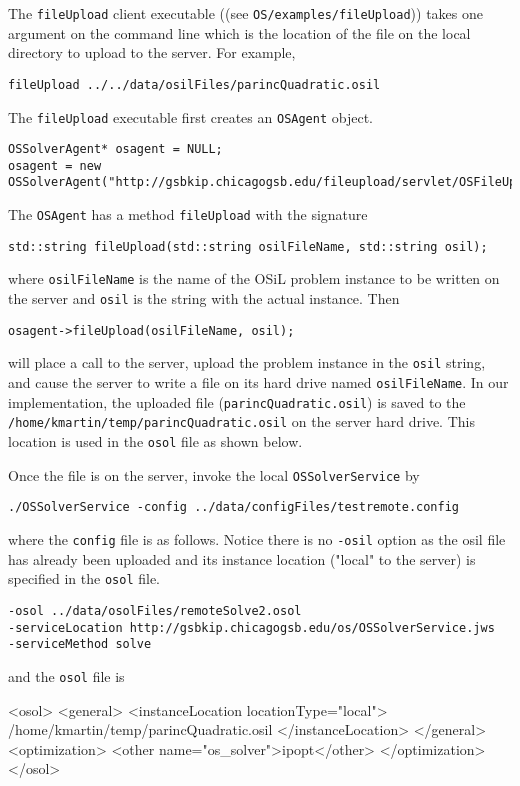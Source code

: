\documentclass[11pt]{article}
\renewcommand{\_}{{\char"5F}}
\renewcommand{\{}{{\char"7B}}
\renewcommand{\}}{{\char"7D}}
\renewcommand{\^}{{\char"0D}}
\renewcommand{\'}{{\char"0D}}
\begin{document}
The {\tt fileUpload} client executable ((see {\tt OS/examples/fileUpload})) takes one argument on the command line which is the location of the file on the local directory to upload to the server. For example,
\begin{verbatim}
fileUpload ../../data/osilFiles/parincQuadratic.osil
\end{verbatim}
The {\tt fileUpload} executable first creates an {\tt OSAgent} object.
\begin{verbatim}
OSSolverAgent* osagent = NULL;
osagent = new OSSolverAgent("http://gsbkip.chicagogsb.edu/fileupload/servlet/OSFileUpload");
\end{verbatim}
The {\tt OSAgent}  has a method {\tt fileUpload} with the signature
\begin{verbatim}
std::string fileUpload(std::string osilFileName, std::string osil);
\end{verbatim}
where {\tt osilFileName} is  the name of the OSiL problem instance to be written on the server and {\tt osil} is the string with the actual instance. Then
\begin{verbatim}
osagent->fileUpload(osilFileName, osil);
\end{verbatim}
will place a call to the server, upload the problem instance in the {\tt osil} string, and cause the server to write a file on its hard drive named {\tt osilFileName}. In our implementation, the uploaded file ({\tt parincQuadratic.osil}) is saved to the {\tt/home/kmartin/temp/parincQuadratic.osil} on the server hard drive. This location is used in the {\tt osol} file as shown below. 

Once the file is on the server, invoke the local {\tt OSSolverService} by
\begin{verbatim}
./OSSolverService -config ../data/configFiles/testremote.config
\end{verbatim}
where the {\tt config} file is as follows. Notice there is no {\tt -osil}  option as the osil file has already been uploaded and its instance location ("local" to the server) is specified in the {\tt osol} file.
\begin{verbatim}
-osol ../data/osolFiles/remoteSolve2.osol
-serviceLocation http://gsbkip.chicagogsb.edu/os/OSSolverService.jws
-serviceMethod solve
\end{verbatim}
and the {\tt osol} file is
\begin{verbatimtab}[5]
<osol>
    <general>
         <instanceLocation locationType="local">
         	/home/kmartin/temp/parincQuadratic.osil
         </instanceLocation>
    </general>
    <optimization>
    	<other name="os_solver">ipopt</other>
    </optimization>
</osol>
\end{verbatimtab}
\end{document}
